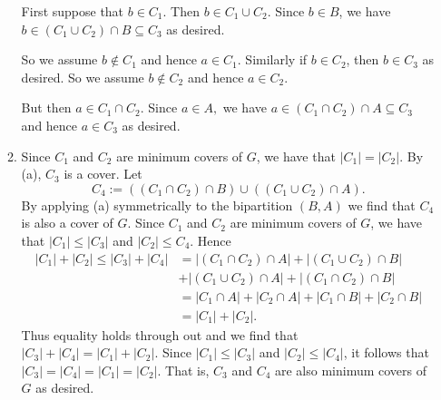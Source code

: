 \begin{enumerate}
\begin{enumerate}
        First suppose that $b\in C_1$. Then $b\in C_1 \cup C_2$. Since $b \in B$, we have $b \in (C_1 \cup C_2) \cap B \subseteq C_3$ as desired.

        So we assume $b \not \in C_1$ and hence $a \in C_1$. 
        Similarly if $b \in C_2$, then $b \in C_3$ as desired. So we assume $b \not \in C_2$ and hence $a \in C_2$.

        But then $a \in C_1 \cap C_2$. Since $a \in A,$ we have $a \in (C_1 \cap C_2) \cap A \subseteq C_3$ and hence $a \in C_3$ as desired.
        \item Since $C_1$ and $C_2$ are minimum covers of $G$, we have that $|C_1| = |C_2|.$ By (a), $C_3$ is a cover. Let 
        \[C_4 := ((C_1 \cap C_2)\cap B) \cup ((C_1 \cup C_2) \cap A).\]
        By applying (a) symmetrically to the bipartition $(B,A)$ we find that $C_4$ is also a cover of $G$.
        Since $C_1$ and $C_2$ are minimum covers of $G$, we have that $|C_1| \leq |C_3|$ and $|C_2| \leq C_4$. Hence
        \begin{align*}
            |C_1| + |C_2| \leq |C_3| + |C_4| &= |(C_1 \cap C_2) \cap A| +|(C_1 \cup C_2) \cap B|\\ & + |(C_1 \cup C_2) \cap A|  + |(C_1 \cap C_2) \cap B| \\
            &= |C_1 \cap A| + |C_2 \cap A| + |C_1 \cap B| + |C_2 \cap B| \\
            &= |C_1| + |C_2|.
        \end{align*}
        Thus equality holds through out and we find that $|C_3| + |C_4| = |C_1| + |C_2|.$ Since $|C_1| \leq |C_3|$ and $|C_2| \leq |C_4|$, it follows that $|C_3|=|C_4| = |C_1| = |C_2|$. That is, $C_3$ and $C_4$ are also minimum covers of $G$ as desired.
    \end{enumerate}
\end{enumerate}